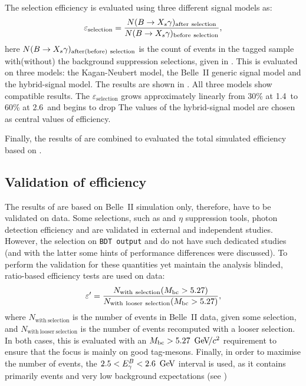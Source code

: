 The \BtoXsgamma selection efficiency is evaluated using three different signal models as:
\begin{equation}\label{eq:signal_efficiency}
    \varepsilon_{\mathrm{selection}} = \frac{N(\BtoXsgamma)_{\mathrm{after~selection}}}{N(\BtoXsgamma)_{\mathrm{before~selection}}},
\end{equation}
here $N(\BtoXsgamma)_{\mathrm{after(before)~selection}}$ is the count of \BtoXsgamma events in the \FEI tagged sample with(without) 
the background suppression selections, given in .
This is evaluated on three models: the Kagan-Neubert model, the Belle~II generic \MC signal model and the hybrid-signal model.
The results are shown in .
All three models show compatible results.
The $\varepsilon_{\mathrm{selection}}$ grows approximately linearly from 30\% at 1.4~\gev to 60\% at 2.6~\gev and begins to drop
The values of the hybrid-signal model are chosen as central values of efficiency.

Finally, the results of  are combined to evaluated the total simulated efficiency based on .

\subsection{Validation of \texorpdfstring{\BtoXsgamma}{B->Xs gamma} efficiency}\label{sec:validation_efficiency}

The results of  are based on Belle~II simulation only, therefore, have to be validated on data.
Some selections, such as \piz and $\eta$ suppression tools, photon detection efficiency and \FEI are validated in external and independent studies.
However, the selection on \texttt{BDT~output} and \ZMVA do not have such dedicated studies (and with the latter some hints of performance differences were discussed).
To perform the validation for these quantities yet maintain the analysis blinded, ratio-based efficiency tests are used on data:
\begin{equation}\label{eq:signal_validation}
    \varepsilon' = \frac{N_{\mathrm{with~selection}}({M_{\mathrm{bc}}}>5.27)}{N_{\mathrm{with~looser~selection}} ({M_{\mathrm{bc}}}>5.27)},
\end{equation}
where $N_{\mathrm{with~selection}}$ is the number of events in Belle~II data, given some selection,
and $N_{\mathrm{with~looser~selection}}$ is the number of events recomputed with a looser selection.
In both cases, this is evaluated with an ${M_{\mathrm{bc}}}>5.27~{\mathrm{\,Ge\kern -0.1em V\!/}c^2}$ requirement to ensure that the focus is mainly on good tag-\B mesons.
Finally, in order to maximise the number of \BtoXsgamma events, the $2.5<{E^B_{\gamma}}<2.6~\mathrm{\,Ge\kern -0.1em V}$ interval is used, as it contains primarily \BtoXsgamma events and very low background expectations (see )


